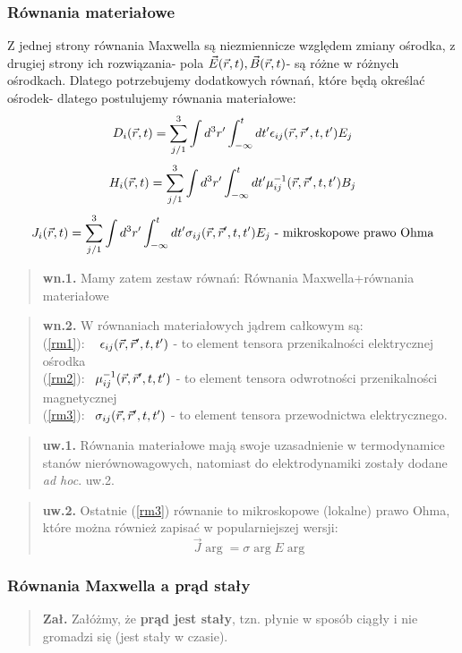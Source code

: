 	\subsubsection{Równania materiałowe} 
	Z jednej strony równania Maxwella są niezmiennicze względem zmiany ośrodka, z drugiej strony ich rozwiązania- pola $\vec{E}(\vec{r},t),\vec{B}(\vec{r},t)$- są różne w różnych ośrodkach. Dlatego potrzebujemy dodatkowych równań, które będą określać ośrodek- dlatego postulujemy równania materiałowe:
	\begin{equation} {D}_i(\vec{r},t)=\sum_{j/1}^3\int d^3r'\int_{-\infty}^t dt' \epsilon_{ij}(\vec{r},\vec{r}',t,t') E_j \label{rm1}\end{equation}
	\begin{equation} H_i (\vec{r},t) =\sum_{j/1}^3\int d^3r'\int_{-\infty}^t dt' \mu^{-1}_{ij}(\vec{r},\vec{r}',t,t') B_j \label{rm2}\end{equation}
	\begin{equation} J_i (\vec{r},t) =\sum_{j/1}^3\int d^3r'\int_{-\infty}^t dt' \sigma_{ij}(\vec{r},\vec{r}',t,t') E_j \label{rm3}  \text{ - mikroskopowe prawo Ohma}\end{equation}
	\begin{verse}\textbf{wn.1.} Mamy zatem zestaw równań: Równania Maxwella+równania materiałowe \end{verse}
	\begin{verse}\textbf{wn.2.} W równaniach materiałowych jądrem całkowym są:\\
	(\ref{rm1}): ~ $\epsilon_{ij}(\vec{r},\vec{r}',t,t')$ - to element tensora przenikalności elektrycznej ośrodka\\
	(\ref{rm2}):  ~$\mu^{-1}_{ij}(\vec{r},\vec{r}',t,t')$ - to element tensora odwrotności przenikalności magnetycznej\\
	(\ref{rm3}):  ~$\sigma_{ij}(\vec{r},\vec{r}',t,t')$  - to element tensora przewodnictwa elektrycznego. \end{verse}
	\begin{verse} \textbf{uw.1.} Równania materiałowe mają swoje uzasadnienie w termodynamice stanów nierównowagowych, natomiast do elektrodynamiki zostały dodane \textsl{ad hoc}.
	uw.2. \end{verse}
	\begin{verse} \textbf{uw.2.} Ostatnie (\ref{rm3}) równanie to mikroskopowe (lokalne) prawo Ohma, które można również zapisać w popularniejszej wersji:
	\begin{equation} \vec{J} \arg =\sigma\arg E\arg \end{equation} \end{verse}

	\subsubsection{Równania Maxwella a prąd stały}
	\begin{verse} \textbf{Zał.} Załóżmy, że \textbf{prąd jest stały}, tzn. płynie w sposób ciągły i nie gromadzi się (jest stały w czasie). \end{verse}

